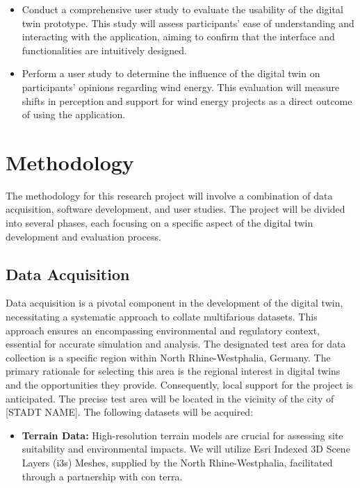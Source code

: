 \documentclass[11pt, titlepage, a4paper]{scrartcl}
\begin{document}
\begin{linenumbers}
\begin{itemize}[label={--}]
        \item Conduct a comprehensive user study to evaluate the usability of the digital twin prototype. This study will assess participants' ease of understanding and interacting with the application, aiming to confirm that the interface and functionalities are intuitively designed.
        \item Perform a user study to determine the influence of the digital twin on participants' opinions regarding wind energy. This evaluation will measure shifts in perception and support for wind energy projects as a direct outcome of using the application.
    \end{itemize}


    \section{Methodology}
    The methodology for this research project will involve a combination of data acquisition, software development, and user studies. The project will be divided into several phases, each focusing on a specific aspect of the digital twin development and evaluation process.

    \subsection{Data Acquisition}
    Data acquisition is a pivotal component in the development of the digital twin, necessitating a systematic approach to collate multifarious datasets. This approach ensures an encompassing environmental and regulatory context, essential for accurate simulation and analysis. The designated test area for data collection is a specific region within North Rhine-Westphalia, Germany. The primary rationale for selecting this area is the regional interest in digital twins and the opportunities they provide. Consequently, local support for the project is anticipated. The precise test area will be located in the vicinity of the city of [STADT NAME]. %
    The following datasets will be acquired:

    \begin{itemize}
        \item \textbf{Terrain Data:} High-resolution terrain models are crucial for assessing site suitability and environmental impacts. We will utilize Esri Indexed 3D Scene Layers (i3s) Meshes, supplied by the North Rhine-Westphalia, facilitated through a partnership with con terra.


\end{itemize}
\end{linenumbers}
\end{document}
